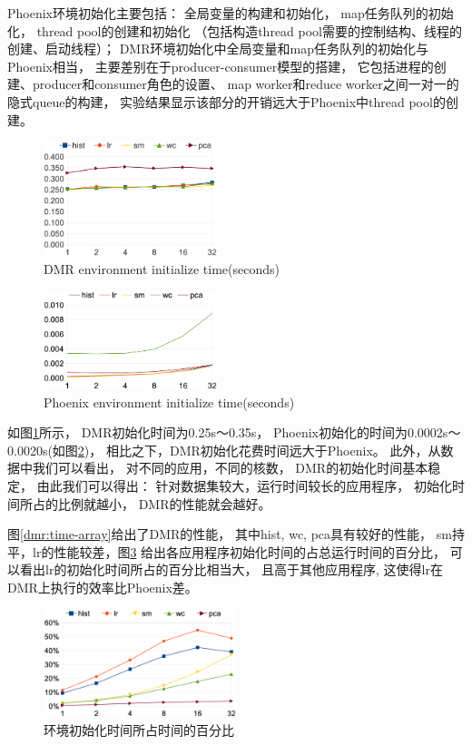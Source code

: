 Phoenix环境初始化主要包括：
全局变量的构建和初始化，
map任务队列的初始化，
thread pool的创建和初始化
（包括构造thread pool需要的控制结构、线程的创建、启动线程）；
DMR环境初始化中全局变量和map任务队列的初始化与Phoenix相当，
主要差别在于producer-consumer模型的搭建，
它包括进程的创建、producer和consumer角色的设置、
map worker和reduce worker之间一对一的隐式queue的构建，
实验结果显示该部分的开销远大于Phoenix中thread pool的创建。
\begin{figure}[!h!t]  
    \centering
    \includegraphics[width=0.45\textwidth]{img/dmr_spmcinit.eps}
    \caption{DMR environment initialize time(seconds)}
    \label{dmr:environment}
\end{figure}
\begin{figure}[!h!t]  
    \centering
    \includegraphics[width=0.45\textwidth]{img/phoenix_init.eps}
    \caption{Phoenix environment initialize time(seconds)}
    \label{phoenix:environment}
\end{figure}

如图\ref{dmr:environment}所示，
DMR初始化时间为0.25s～0.35s，
Phoenix初始化的时间为0.0002s～0.0020s(如图\ref{phoenix:environment})，
相比之下，DMR初始化花费时间远大于Phoenix。
此外，从数据中我们可以看出，
对不同的应用，不同的核数，
DMR的初始化时间基本稳定，
由此我们可以得出：
针对数据集较大，运行时间较长的应用程序，
初始化时间所占的比例就越小，
DMR的性能就会越好。


图\ref{dmr:time-array}给出了DMR的性能，
其中hist, wc, pca具有较好的性能，
sm持平，lr的性能较差，图\ref{dmr:init-percent}
给出各应用程序初始化时间的占总运行时间的百分比，
可以看出lr的初始化时间所占的百分比相当大，
且高于其他应用程序,
这使得lr在DMR上执行的效率比Phoenix差。

\begin{figure}[!h!t]  
    \centering
    \includegraphics[width=0.5\textwidth]{img/dmr_init_percent.eps}
    \caption{环境初始化时间所占时间的百分比}
    \label{dmr:init-percent}
\end{figure}



